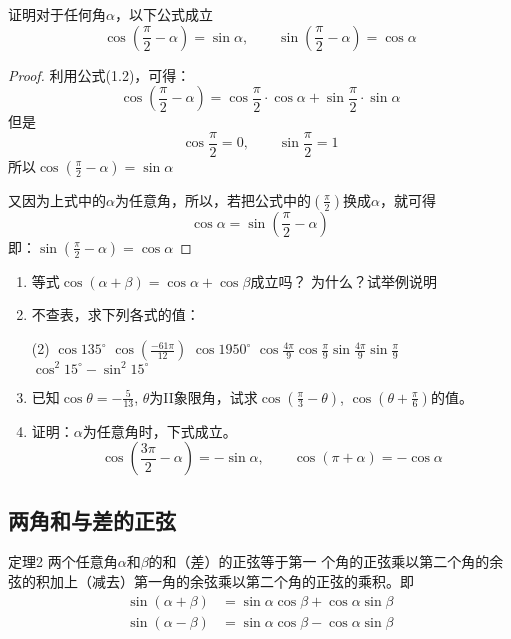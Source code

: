 \begin{example}
证明对于任何角$\alpha$，以下公式成立
\[\cos\left(\frac{\pi}{2}-\alpha\right)=\sin \alpha,\qquad \sin\left(\frac{\pi}{2}-\alpha\right)=\cos \alpha\]
\end{example}

\begin{proof}
利用公式(1.2)，可得：
\[\cos\left(\frac{\pi}{2}-\alpha\right)=\cos\frac{\pi}{2}\cdot \cos\alpha+\sin\frac{\pi}{2}\cdot \sin \alpha\]
但是
\[\cos\frac{\pi}{2}=0,\qquad \sin\frac{\pi}{2}=1\]
所以$\cos\left(\frac{\pi}{2}-\alpha\right)=\sin\alpha$

又因为上式中的$\alpha$为任意角，所以，若把公式中的$\left(\frac{\pi}{2}\right)$换成$\alpha$，就可得
\[\cos\alpha=\sin\left(\frac{\pi}{2}-\alpha\right)\]
即：$\sin\left(\frac{\pi}{2}-\alpha\right)=\cos\alpha$
\end{proof}

\begin{ex}
\begin{enumerate}
    \item 等式$\cos(\alpha+\beta)=\cos\alpha+\cos\beta$成立吗？
    为什么？试举例说明
    
    \item 不查表，求下列各式的值：
    \begin{tasks}(2)
        \task $\cos135^{\circ}$
        \task $\cos\left(\frac{-61\pi}{12}\right)$
        \task $\cos1950^{\circ}$
        \task $\cos\frac{4\pi}{9} \cos\frac{\pi}{9}\sin\frac{4\pi}{9}\sin \frac{\pi}{9}$
        \task $\cos^2 15^{\circ}-\sin^2 15^{\circ}$
    \end{tasks}        

\item 已知$\cos\theta=-\frac{5}{13}$, $\theta$为II象限角，试求$\cos\left(\frac{\pi}{3}-\theta\right)$,
    $\cos\left(\theta+\frac{\pi}{6}\right)$的值。
    \item 证明：$\alpha$为任意角时，下式成立。
\[\cos\left(\frac{3\pi}{2}-\alpha\right)=-\sin\alpha,\qquad \cos(\pi+\alpha)=-\cos\alpha  \]
\end{enumerate}
\end{ex}


\subsection{两角和与差的正弦}
\begin{blk}{定理2}
两个任意角$\alpha$和$\beta$的和（差）的正弦等于第一
个角的正弦乘以第二个角的余弦的积加上（减去）第一角的余弦乘以第二个角的正弦的乘积。即
\begin{align}
    \sin (\alpha+\beta) &=\sin\alpha\cos\beta+\cos\alpha\sin\beta \\
    \sin (\alpha-\beta) &=\sin\alpha\cos\beta-\cos\alpha\sin\beta
\end{align}
\end{blk}

